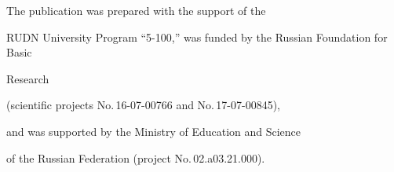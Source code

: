 





























\Ack


\noindent


The publication was prepared with the support of the 


RUDN University Program \mbox{``5-100,''} was funded by the Russian Foundation for Basic


Research 


(scientific projects No.\,16-07-00766 and No.\,17-07-00845), 


and was supported by the Ministry of Education and Science 


of the Russian Federation (project No.\,02.a03.21.000).


 








\renewcommand{\bibname}{\protect\rmfamily References}







